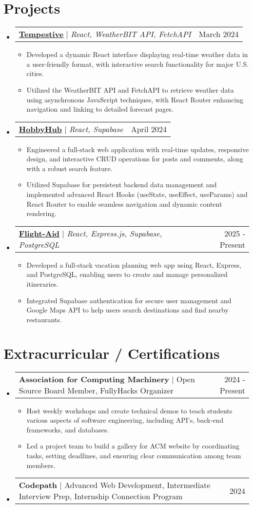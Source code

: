 \documentclass[letterpaper,11pt]{article}
\makeatletter
\newcommand{\resumeItem}[1]{
  \item\small{
    {#1 \vspace{-2pt}}
  }
}
\newcommand{\resumeProjectHeading}[2]{
    \item
    \begin{tabular*}{0.97\textwidth}{l@{\extracolsep{\fill}}r}
      \small#1 & #2 \\
    \end{tabular*}\vspace{-7pt}
}
\newcommand{\resumeSubHeadingListStart}{\begin{itemize}[leftmargin=0.1in, label={}]}
\newcommand{\resumeSubHeadingListEnd}{\end{itemize}}
\newcommand{\resumeItemListStart}{\begin{itemize}}
\newcommand{\resumeItemListEnd}{\end{itemize}\vspace{-5pt}}
\makeatother
\begin{document}
\section{Projects}
    \resumeSubHeadingListStart
      \resumeProjectHeading
          {{\textbf{\href{https://github.com/nestor-remo/WeatherAPI}{Tempestive}}} $|$ \emph{React, WeatherBIT API, FetchAPI}} {March 2024}
          \resumeItemListStart
            \resumeItem{Developed a dynamic React interface displaying real-time weather data in a user-friendly format, with interactive search functionality for major U.S. cities.}
            \resumeItem{Utilized the WeatherBIT API and FetchAPI to retrieve weather data using asynchronous JavaScript techniques, with React Router enhancing navigation and linking to detailed forecast pages.}
          \resumeItemListEnd
      \resumeProjectHeading
          {{\textbf{\href{https://hubhobby.netlify.app/}{HobbyHub}}} $|$ \emph{React, Supabase}} {April 2024}
          \resumeItemListStart
            \resumeItem{Engineered a full-stack web application with real-time updates, responsive design, and interactive CRUD operations for posts and comments, along with a robust search feature.}
            \resumeItem{Utilized Supabase for persistent backend data management and implemented advanced React Hooks (useState, useEffect, useParams) and React Router to enable seamless navigation and dynamic content rendering.}
          \resumeItemListEnd
        \resumeProjectHeading
            {{\textbf{\href{https://github.com/nestor-remo}{Flight-Aid}}} $|$ \emph{React, Express.js, Supabase, PostgreSQL}} {2025 - Present}
            \resumeItemListStart
                \resumeItem{Developed a full-stack vacation planning web app using React, Express, and PostgreSQL, enabling users to create and manage personalized itineraries.}
                \resumeItem{Integrated Supabase authentication for secure user management and Google Maps API to help users search destinations and find nearby restaurants.}
            \resumeItemListEnd
        
    \resumeSubHeadingListEnd



\section{Extracurricular / Certifications }
    \resumeSubHeadingListStart
        \resumeProjectHeading
          {{\textbf{{Association for Computing Machinery}}} $|$ {Open Source Board Member, FullyHacks Organizer }} {2024 - Present}
          \resumeItemListStart
            \resumeItem{Host weekly workshops and create technical demos to teach students various aspects of software engineering, including API's, back-end frameworks, and databases.}
            \resumeItem{ Led a project team to build a gallery for ACM website by coordinating tasks, setting deadlines, and ensuring clear communication among team members.}
          \resumeItemListEnd
        \resumeProjectHeading
          {{\textbf{{Codepath}}} $|$ {Advanced Web Development, Intermediate Interview Prep, Internship Connection Program}} {2024}
    \resumeSubHeadingListEnd
\end{document}
